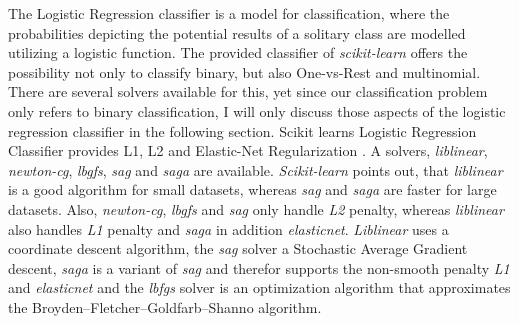 \documentclass[a4paper, 11pt,titlepage,oneside,openany]{book}
\begin{document}
\indent The Logistic Regression classifier is a model for classification, where the probabilities depicting the potential results of a solitary class are modelled utilizing a logistic function. The provided classifier of \textit{scikit-learn} offers the possibility not only to classify binary, but also One-vs-Rest and multinomial. There are several solvers available for this, yet since our classification problem only refers to binary classification, I will only discuss those aspects of the logistic regression classifier in the following section. Scikit learns Logistic Regression Classifier provides L1, L2 and Elastic-Net Regularization \cite{logisticregression}. A solvers, \textit{liblinear}, \textit{newton-cg}, \textit{lbgfs}, \textit{sag} and \textit{saga} are available. \textit{Scikit-learn} points out, that \textit{liblinear} is a good algorithm for small datasets, whereas \textit{sag} and \textit{saga} are faster for large datasets. Also, \textit{newton-cg}, \textit{lbgfs} and \textit{sag} only handle \textit{L2} penalty, whereas \textit{liblinear} also handles \textit{L1} penalty and \textit{saga} in addition \textit{elasticnet}. \textit{Liblinear} uses a coordinate descent algorithm, the \textit{sag} solver a Stochastic Average Gradient descent, \textit{saga} is a variant of \textit{sag} and therefor supports the non-smooth penalty \textit{L1} and \textit{elasticnet} and the \textit{lbfgs} solver is an optimization algorithm that approximates the Broyden–Fletcher–Goldfarb–Shanno algorithm.\\
\end{document}
